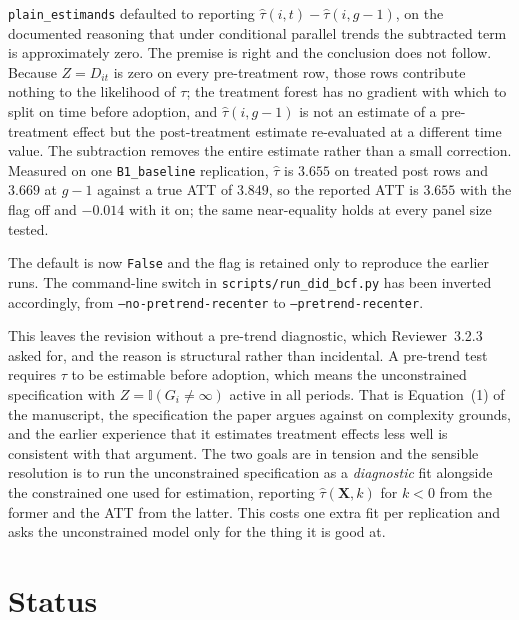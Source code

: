 \documentclass[11pt]{article}
\newcommand{\Xb}{\mathbf{X}}
\begin{document}
\texttt{plain\_estimands} defaulted to reporting
$\hat\tau(i,t) - \hat\tau(i,g-1)$, on the documented reasoning that under
conditional parallel trends the subtracted term is approximately zero. The
premise is right and the conclusion does not follow. Because $Z = D_{it}$ is
zero on every pre-treatment row, those rows contribute nothing to the
likelihood of $\tau$; the treatment forest has no gradient with which to split
on time before adoption, and $\hat\tau(i, g-1)$ is not an estimate of a
pre-treatment effect but the post-treatment estimate re-evaluated at a
different time value. The subtraction removes the entire estimate rather than a
small correction. Measured on one \texttt{B1\_baseline} replication,
$\hat\tau$ is $3.655$ on treated post rows and $3.669$ at $g-1$ against a true
ATT of $3.849$, so the reported ATT is $3.655$ with the flag off and $-0.014$
with it on; the same near-equality holds at every panel size tested.

The default is now \texttt{False} and the flag is retained only to reproduce
the earlier runs. The command-line switch in \texttt{scripts/run\_did\_bcf.py}
has been inverted accordingly, from \texttt{--no-pretrend-recenter} to
\texttt{--pretrend-recenter}.

This leaves the revision without a pre-trend diagnostic, which
Reviewer~3.2.3 asked for, and the reason is structural rather than incidental.
A pre-trend test requires $\tau$ to be estimable before adoption, which means
the unconstrained specification with $Z = \mathbb{I}(G_i \neq \infty)$ active in
all periods. That is Equation~(1) of the manuscript, the specification the
paper argues against on complexity grounds, and the earlier experience that it
estimates treatment effects less well is consistent with that argument. The two
goals are in tension and the sensible resolution is to run the unconstrained
specification as a \emph{diagnostic} fit alongside the constrained one used for
estimation, reporting $\hat\tau(\Xb, k)$ for $k<0$ from the former and the ATT
from the latter. This costs one extra fit per replication and asks the
unconstrained model only for the thing it is good at.

\section{Status}
\end{document}
